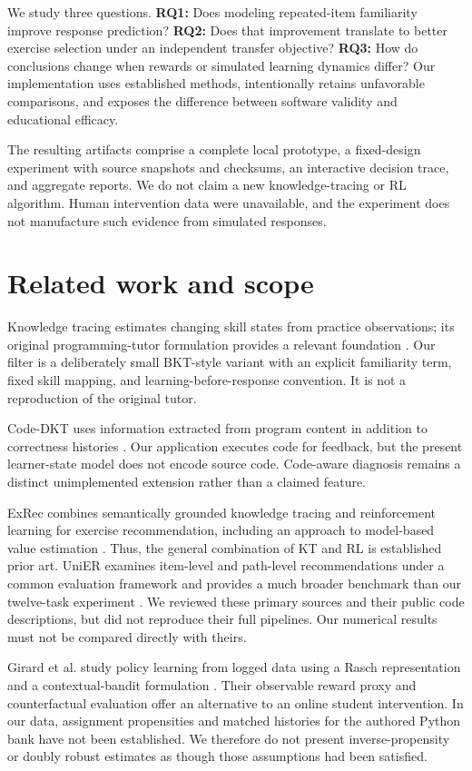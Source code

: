 \documentclass[11pt,a4paper]{article}
\begin{document}
We study three questions. \textbf{RQ1:} Does modeling repeated-item familiarity improve response prediction? \textbf{RQ2:} Does that improvement translate to better exercise selection under an independent transfer objective? \textbf{RQ3:} How do conclusions change when rewards or simulated learning dynamics differ? Our implementation uses established methods, intentionally retains unfavorable comparisons, and exposes the difference between software validity and educational efficacy.

The resulting artifacts comprise a complete local prototype, a fixed-design experiment with source snapshots and checksums, an interactive decision trace, and aggregate reports. We do not claim a new knowledge-tracing or RL algorithm. Human intervention data were unavailable, and the experiment does not manufacture such evidence from simulated responses.

\section{Related work and scope}
Knowledge tracing estimates changing skill states from practice observations; its original programming-tutor formulation provides a relevant foundation \cite{bkt}. Our filter is a deliberately small BKT-style variant with an explicit familiarity term, fixed skill mapping, and learning-before-response convention. It is not a reproduction of the original tutor.

Code-DKT uses information extracted from program content in addition to correctness histories \cite{codedkt}. Our application executes code for feedback, but the present learner-state model does not encode source code. Code-aware diagnosis remains a distinct unimplemented extension rather than a claimed feature.

ExRec combines semantically grounded knowledge tracing and reinforcement learning for exercise recommendation, including an approach to model-based value estimation \cite{exrec}. Thus, the general combination of KT and RL is established prior art. UniER examines item-level and path-level recommendations under a common evaluation framework and provides a much broader benchmark than our twelve-task experiment \cite{unier}. We reviewed these primary sources and their public code descriptions, but did not reproduce their full pipelines. Our numerical results must not be compared directly with theirs.

Girard et al. study policy learning from logged data using a Rasch representation and a contextual-bandit formulation \cite{girard}. Their observable reward proxy and counterfactual evaluation offer an alternative to an online student intervention. In our data, assignment propensities and matched histories for the authored Python bank have not been established. We therefore do not present inverse-propensity or doubly robust estimates as though those assumptions had been satisfied.
\end{document}
